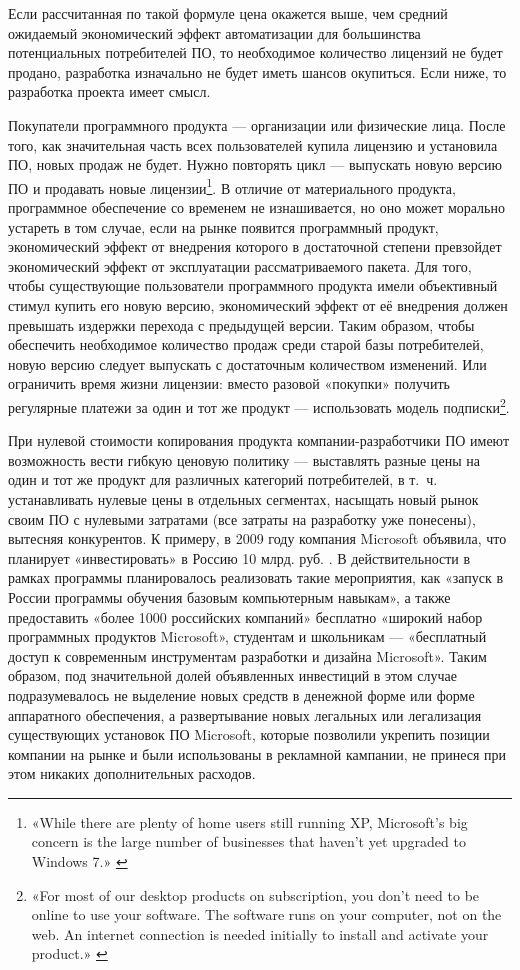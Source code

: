 \documentclass{article}
\begin{document}
Если рассчитанная по такой формуле цена окажется выше, чем средний ожидаемый экономический эффект автоматизации для большинства потенциальных потребителей ПО, то необходимое количество лицензий не будет продано, разработка изначально не будет иметь шансов окупиться. Если ниже, то разработка проекта имеет смысл.

Покупатели программного продукта — организации или физические лица. После того, как значительная часть всех пользователей купила лицензию и установила ПО, новых продаж не будет. Нужно повторять цикл — выпускать новую версию ПО и продавать новые лицензии\footnote{«While there are plenty of home users still running XP, Microsoft’s big concern is the large number of businesses that haven’t yet upgraded to Windows 7.» \cite{windowsXPLegacy}}. В отличие от материального продукта, программное обеспечение со временем не изнашивается, но оно может морально устареть в том случае, если на рынке появится программный продукт, экономический эффект от внедрения которого в достаточной степени превзойдет экономический эффект от эксплуатации рассматриваемого пакета. Для того, чтобы существующие пользователи программного продукта имели объективный стимул купить его новую версию, экономический эффект от её внедрения должен превышать издержки перехода с предыдущей версии. Таким образом, чтобы обеспечить необходимое количество продаж среди старой базы потребителей, новую версию следует выпускать с достаточным количеством изменений. Или ограничить время жизни лицензии: вместо разовой «покупки» получить регулярные платежи за один и тот же продукт — использовать модель подписки\footnote{«For most of our desktop products on subscription, you don't need to be online to use your software. The software runs on your computer, not on the web. An internet connection is needed initially to install and activate your product.» \cite{autodeskSubscription}}.

При нулевой стоимости копирования продукта компании-разработчики ПО имеют возможность вести гибкую ценовую политику — выставлять разные цены на один и тот же продукт для различных категорий потребителей, в т.~ч. устанавливать нулевые цены в отдельных сегментах, насыщать новый рынок своим ПО с нулевыми затратами (все затраты на разработку уже понесены), вытесняя конкурентов. К примеру, в 2009 году компания Microsoft объявила, что планирует «инвестировать» в Россию 10 млрд. руб. \cite{microsoftInvestsRF}. В действительности в рамках программы планировалось реализовать такие мероприятия, как «запуск в России программы обучения базовым компьютерным навыкам», а также предоставить «более 1000 российских компаний» бесплатно «широкий набор программных продуктов Microsoft», студентам и школьникам — «бесплатный доступ к современным инструментам разработки и дизайна Microsoft». Таким образом, под значительной долей объявленных инвестиций в этом случае подразумевалось не выделение новых средств в денежной форме или форме аппаратного обеспечения, а развертывание новых легальных или легализация существующих установок ПО Microsoft, которые позволили укрепить позиции компании на рынке и были использованы в рекламной кампании, не принеся при этом никаких дополнительных расходов.
\end{document}
